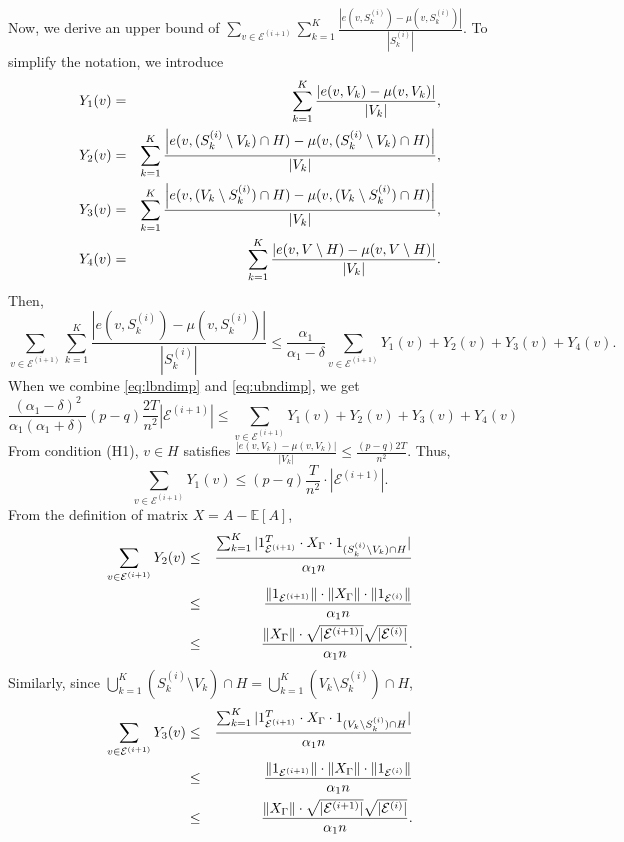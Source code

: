 Now, we derive an upper bound of $\sum_{v\in \mathcal{E}^{(i+1)}}\sum_{k=1}^{K}\frac{|e(v,S^{(i)}_k)-\mu(v,S^{(i)}_k) |}{| S^{(i)}_k |}.$ To simplify the notation, we introduce\begin{eqnarray*}
Y_1(v)& = &\sum_{k=1}^{K}\frac{\left| e(v,V_k)-\mu(v,V_k) \right|}{|
  V_k |} , \cr
Y_2(v)& = &\sum_{k=1}^{K}\frac{\left| e(v, (S^{(i)}_k \setminus V_k) \cap
    H)-\mu(v,(S^{(i)}_k \setminus V_k) \cap H) \right|}{| V_k |} , \cr
Y_3(v)& = &\sum_{k=1}^{K}\frac{\left| e(v, (V_k \setminus S^{(i)}_k) \cap H)-\mu(v,(V_k \setminus S^{(i)}_k) \cap H) \right|}{| V_k |} , \cr
Y_4(v)& = &\sum_{k=1}^{K}\frac{\left| e(v,V\setminus H)-\mu(v,V\setminus H)
  \right|}{|V_k |} . 
\end{eqnarray*}
Then,
\begin{equation}
\sum_{v\in \mathcal{E}^{(i+1)}}\sum_{k=1}^{K}\frac{|e(v,S^{(i)}_k)-\mu(v,S^{(i)}_k) |}{| S^{(i)}_k |} \le \frac{\alpha_1}{\alpha_1-\delta}\sum_{v\in  \mathcal{E}^{(i+1)}} Y_1(v)+Y_2(v)+Y_3(v)+Y_4(v). \label{eq:ubndimp}
\end{equation}
When we combine \eqref{eq:lbndimp} and \eqref{eq:ubndimp}, we get
\begin{equation}
\frac{(\alpha_1-\delta)^2}{\alpha_1(\alpha_1+\delta)}(p-q)\frac{2T}{n^2} |
\mathcal{E}^{(i+1)} | \le \sum_{v\in  \mathcal{E}^{(i+1)}}
Y_1(v)+Y_2(v)+Y_3(v) + Y_4(v)
\label{eq:impbnd}
\end{equation}
From condition (H1), $v \in H$ satisfies
$\frac{|e(v,V_k)-\mu(v,V_k)|}{|V_k|} \le \frac{(p-q)2T}{n^2}.$ Thus,
$$\sum_{v\in  \mathcal{E}^{(i+1)}} Y_1(v) \le (p-q)\frac{T}{n^2} \cdot |  \mathcal{E}^{(i+1)}|.$$
From the definition of matrix $X = A - \mathbb{E}[A]$,
\begin{eqnarray*}
\sum_{v\in  \mathcal{E}^{(i+1)}} Y_2(v) & \le &\frac{\sum_{k=1}^K|
1_{ \mathcal{E}^{(i+1)}}^T \cdot X_{\Gamma} \cdot
1_{ (S^{(i)}_k\setminus V_k) \cap H}|}{\alpha_1 n}  \cr
& \le & \frac{\|1_{ \mathcal{E}^{(i+1)}}\|\cdot \|X_{\Gamma}\|\cdot \|1_{ \mathcal{E}^{(i)}}\|}{\alpha_1 n} \cr
&\le & \frac{ \|X_{\Gamma}\| \cdot \sqrt{ |  \mathcal{E}^{(i+1)}
    |}\sqrt{|  \mathcal{E}^{(i)}|}}{\alpha_1 n}.\end{eqnarray*}
Similarly, since $\bigcup_{k=1}^K(S^{(i)}_k\setminus V_k)\cap H =
\bigcup_{k=1}^K(V_k \setminus S^{(i)}_k)\cap H$,
\begin{eqnarray*}
\sum_{v\in  \mathcal{E}^{(i+1)}} Y_3(v) & \le &\frac{\sum_{k=1}^K|
1_{ \mathcal{E}^{(i+1)}}^T \cdot X_{\Gamma} \cdot
1_{ (V_k \setminus S^{(i)}_k) \cap H}|}{\alpha_1 n}  \cr
& \le & \frac{\|1_{ \mathcal{E}^{(i+1)}}\|\cdot \|X_{\Gamma}\|\cdot \|1_{ \mathcal{E}^{(i)}}\|}{\alpha_1 n} \cr
&\le & \frac{ \|X_{\Gamma}\| \cdot \sqrt{ |  \mathcal{E}^{(i+1)}
    |}\sqrt{|  \mathcal{E}^{(i)}|}}{\alpha_1 n}.\end{eqnarray*}
